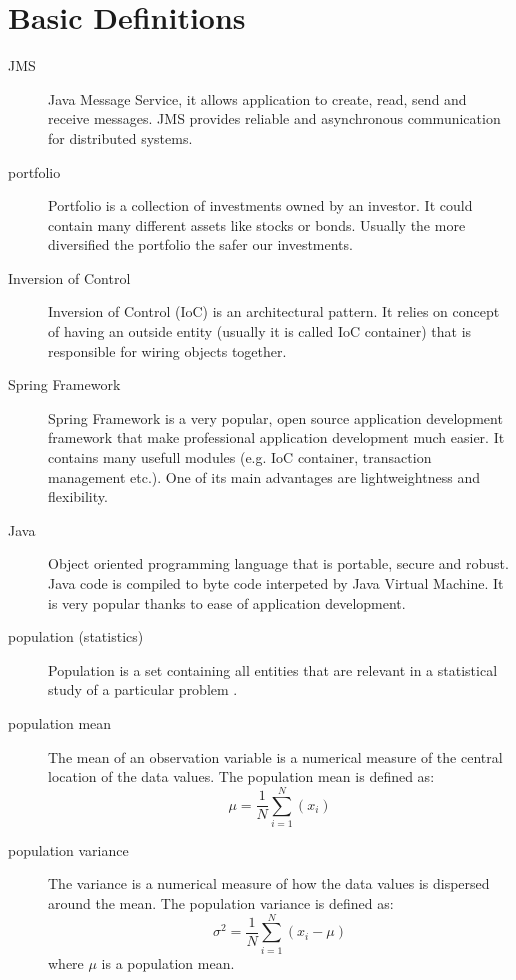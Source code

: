 \chapter{Basic Definitions}
\label{cha:basic}



\begin{description}
  \item [JMS]
	Java Message Service, it allows application to create, read, send and receive messages.
	JMS provides reliable and asynchronous communication for distributed systems. 

  \item [portfolio]
	Portfolio is a collection of investments owned by an investor.
	It could contain many different assets like stocks or bonds.
	Usually the more diversified the portfolio the safer our investments.

  \item [Inversion of Control]
	Inversion of Control (IoC) is an architectural pattern.
	It relies on concept of having an outside entity (usually it is called IoC container) that is responsible for wiring objects together. \cite{Spring} 

  \item [Spring Framework] 
	Spring Framework is a very popular, open source application development framework that make professional application development much easier.
	It contains many usefull modules (e.g. IoC container, transaction management etc.).
	One of its main advantages are lightweightness and flexibility. \cite{Spring}

  \item [Java]
	Object oriented programming language that is portable, secure and robust.
	Java code is compiled to byte code interpeted by Java Virtual Machine. 
	It is very popular thanks to ease of application development. 

  \item [population (statistics)]
	Population is a set containing all entities that are relevant in a statistical study of a particular problem \cite{Oxford}. 

  \item [population mean]
	
	The mean of an observation variable is a numerical measure of the central location of the data values.
	The population mean is defined as:
	 \begin{equation}
			\mu = \frac{1}{N} \sum_{i=1}^{N}{(x_{i})} 
		      \end{equation}
  \item [population variance]
	The variance is a numerical measure of how the data values is dispersed around the mean.
	The population variance is defined as:  
	      \begin{equation}
			\sigma^2 = \frac{1}{N} \sum_{i=1}^{N}{(x_{i} - \mu)} 
		      \end{equation}
	where $\mu$ is a population mean.
	   

\end{description}
